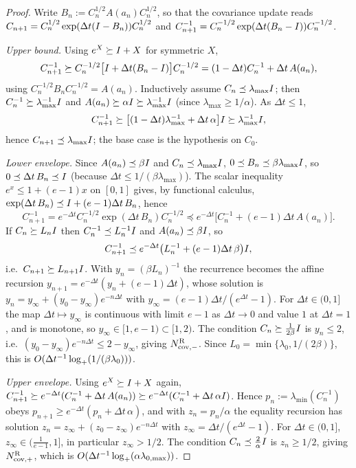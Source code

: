 \begin{proof}
Write $B_n:=C_n^{1/2}A(a_n)C_n^{1/2}$, so that the covariance update reads
$C_{n+1}=C_n^{1/2}\exp(\Delta t(I-B_n))C_n^{1/2}$ and
$C_{n+1}^{-1}=C_n^{-1/2}\exp(\Delta t(B_n-I))C_n^{-1/2}$.

\emph{Upper bound.} Using $e^X\succeq I+X$ for symmetric $X$,
\[
    C_{n+1}^{-1}
    \succeq
    C_n^{-1/2}\bigl[I+\Delta t(B_n-I)\bigr]C_n^{-1/2}
    =
    (1-\Delta t)C_n^{-1}+\Delta t\,A(a_n),
\]
using $C_n^{-1/2}B_nC_n^{-1/2}=A(a_n)$. Inductively assume $C_n\preceq\lambda_{\max}I$;
then $C_n^{-1}\succeq\lambda_{\max}^{-1}I$ and $A(a_n)\succeq\alpha I\succeq\lambda_{\max}^{-1}I$
(since $\lambda_{\max}\geq1/\alpha$). As $\Delta t\leq1$,
\[
    C_{n+1}^{-1}
    \succeq
    \bigl[(1-\Delta t)\lambda_{\max}^{-1}+\Delta t\,\alpha\bigr]I
    \succeq
    \lambda_{\max}^{-1}I,
\]
hence $C_{n+1}\preceq\lambda_{\max}I$; the base case is the hypothesis on $C_0$.

\emph{Lower envelope.} Since $A(a_n)\preceq\beta I$ and $C_n\preceq\lambda_{\max}I$,
$0\preceq B_n\preceq\beta\lambda_{\max}I$, so $0\preceq\Delta t\,B_n\preceq I$ (because
$\Delta t\leq1/(\beta\lambda_{\max})$). The scalar inequality $e^x\leq1+(e-1)x$ on $[0,1]$
gives, by functional calculus, $\exp(\Delta t\,B_n)\preceq I+(e-1)\Delta t\,B_n$, hence
\[
    C_{n+1}^{-1}
    =
    e^{-\Delta t}C_n^{-1/2}\exp(\Delta t\,B_n)C_n^{-1/2}
    \preceq
    e^{-\Delta t}\bigl[C_n^{-1}+(e-1)\Delta t\,A(a_n)\bigr].
\]
If $C_n\succeq L_nI$ then $C_n^{-1}\preceq L_n^{-1}I$ and $A(a_n)\preceq\beta I$, so
\[
    C_{n+1}^{-1}
    \preceq
    e^{-\Delta t}\bigl(L_n^{-1}+(e-1)\Delta t\,\beta\bigr)I,
\]
i.e.\ $C_{n+1}\succeq L_{n+1}I$. With $y_n=(\beta L_n)^{-1}$ the recurrence becomes the
affine recursion $y_{n+1}=e^{-\Delta t}(y_n+(e-1)\Delta t)$, whose solution is
$y_n=y_\infty+(y_0-y_\infty)e^{-n\Delta t}$ with $y_\infty=(e-1)\Delta t/(e^{\Delta t}-1)$.
For $\Delta t\in(0,1]$ the map $\Delta t\mapsto y_\infty$ is continuous with limit $e-1$ as
$\Delta t\to0$ and value $1$ at $\Delta t=1$, and is monotone, so $y_\infty\in[1,e-1)\subset[1,2)$.
The condition $C_n\succeq\tfrac1{2\beta}I$ is $y_n\leq2$, i.e.\
$(y_0-y_\infty)e^{-n\Delta t}\leq2-y_\infty$, giving $N_{\mathrm{cov},-}^{\mathrm{R}}$. Since $L_0=\min\{\lambda_0,1/(2\beta)\}$, this is
$O(\Delta t^{-1}\log_+(1/(\beta\lambda_0)))$.

\emph{Upper envelope.} Using $e^X\succeq I+X$ again,
$C_{n+1}^{-1}\succeq e^{-\Delta t}(C_n^{-1}+\Delta t\,A(a_n))\succeq e^{-\Delta t}(C_n^{-1}+\Delta t\,\alpha I)$.
Hence $p_n:=\lambda_{\min}(C_n^{-1})$ obeys $p_{n+1}\geq e^{-\Delta t}(p_n+\Delta t\,\alpha)$, and with
$z_n=p_n/\alpha$ the equality recursion has solution
$z_n=z_\infty+(z_0-z_\infty)e^{-n\Delta t}$ with $z_\infty=\Delta t/(e^{\Delta t}-1)$. For
$\Delta t\in(0,1]$, $z_\infty\in(\tfrac1{e-1},1]$, in particular $z_\infty>1/2$. The
condition $C_n\preceq\tfrac2\alpha I$ is $z_n\geq1/2$, giving $N_{\mathrm{cov},+}^{\mathrm{R}}$, which is
$O(\Delta t^{-1}\log_+(\alpha\lambda_{0,\max}))$.
\end{proof}

